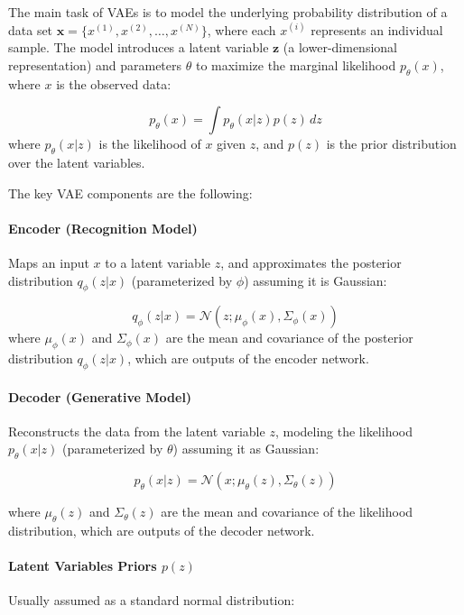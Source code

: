 \documentclass{ieeeaccess}
\begin{document}
The main task of VAEs is to model the underlying probability distribution of a data set $\bm{x} = \{x^{(1)}, x^{(2)}, \ldots, x^{(N)}\}$, where each $x^{(i)}$ represents an individual sample. The model introduces a latent variable $\bm{z}$ (a lower-dimensional representation) and parameters $\theta$ to maximize the marginal likelihood $p_\theta(x)$, where $x$ is the observed data:

\begin{equation}
p_\theta(x) = \int p_\theta(x | z) p(z) \, dz
\end{equation}
where $p_\theta(x | z)$ is the likelihood of $x$ given $z$, and $p(z)$ is the prior distribution over the latent variables.

The key VAE components are the following:

\paragraph{Encoder (Recognition Model)}
Maps an input $x$ to a latent variable $z$, and approximates the posterior distribution $q_\phi(z | x)$ (parameterized by $\phi$) assuming it is Gaussian:

\begin{equation}
q_\phi(z | x) = \mathcal{N}(z; \mu_\phi(x), \Sigma_\phi(x))
\end{equation}
where $\mu_\phi(x)$ and $\Sigma_\phi(x)$ are the mean and covariance of the posterior distribution $q_\phi(z | x)$, which are outputs of the encoder network.

\paragraph{Decoder (Generative Model)}
Reconstructs the data from the latent variable $z$, modeling the likelihood $p_\theta(x | z)$ (parameterized by $\theta$) assuming it as Gaussian:

\begin{equation}
p_\theta(x | z) = \mathcal{N}(x; \mu_\theta(z), \Sigma_\theta(z))
\end{equation}

where $\mu_\theta(z)$ and $\Sigma_\theta(z)$ are the mean and covariance of the likelihood distribution, which are outputs of the decoder network.

\paragraph{Latent Variables Priors $p(z)$}
Usually assumed as a standard normal distribution:
\end{document}
